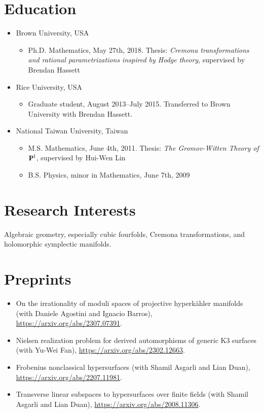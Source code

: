 \documentclass[12pt]{article}
\begin{document}
\section*{Education}
\begin{itemize}[itemsep=0pt,parsep=0pt]
	\item[] Brown University, USA
	\begin{itemize}[itemsep=0pt]
		\item[] Ph.D. Mathematics, May 27th, 2018. Thesis: {\it Cremona transformations and rational parametrizations inspired by Hodge theory}, supervised by Brendan Hassett
	\end{itemize}
	\item[] Rice University, USA
	\begin{itemize}[itemsep=0pt]
		\item[] Graduate student, August 2013--July 2015. Transferred to Brown University with Brendan Hassett.
	\end{itemize}
	\item[] National Taiwan University, Taiwan
	\begin{itemize}[itemsep=0pt]
		\item[] M.S. Mathematics, June 4th, 2011. Thesis: {\it The Gromov-Witten Theory of $\varmathbb{P}^1$}, supervised by Hui-Wen Lin
		\item[] B.S. Physics, minor in Mathematics, June 7th, 2009
	\end{itemize}
\end{itemize}


\section*{Research Interests}
Algebraic geometry, especially cubic fourfolds, Cremona transformations, and holomorphic symplectic manifolds.


\section*{Preprints}
\begin{itemize}[leftmargin=!, itemsep=0pt]
	\item On the irrationality of moduli spaces of projective hyperk\"ahler manifolds (with Daniele Agostini and Ignacio Barros), \url{https://arxiv.org/abs/2307.07391}.
	\item Nielsen realization problem for derived automorphisms of generic K3 surfaces (with Yu-Wei Fan), \url{https://arxiv.org/abs/2302.12663}.
	\item Frobenius nonclassical hypersurfaces (with Shamil Asgarli and Lian Duan), \url{https://arxiv.org/abs/2207.11981}.
	\item Transverse linear subspaces to hypersurfaces over finite fields (with Shamil Asgarli and Lian Duan), \url{https://arxiv.org/abs/2008.11306}.
\end{itemize}
\end{document}
